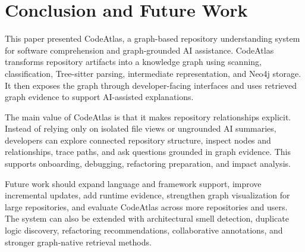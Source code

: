 \documentclass[conference]{IEEEtran}
\begin{document}
\section{Conclusion and Future Work}
This paper presented CodeAtlas, a graph-based repository understanding system for software comprehension and graph-grounded AI assistance. CodeAtlas transforms repository artifacts into a knowledge graph using scanning, classification, Tree-sitter parsing, intermediate representation, and Neo4j storage. It then exposes the graph through developer-facing interfaces and uses retrieved graph evidence to support AI-assisted explanations.

The main value of CodeAtlas is that it makes repository relationships explicit. Instead of relying only on isolated file views or ungrounded AI summaries, developers can explore connected repository structure, inspect nodes and relationships, trace paths, and ask questions grounded in graph evidence. This supports onboarding, debugging, refactoring preparation, and impact analysis.

Future work should expand language and framework support, improve incremental updates, add runtime evidence, strengthen graph visualization for large repositories, and evaluate CodeAtlas across more repositories and users. The system can also be extended with architectural smell detection, duplicate logic discovery, refactoring recommendations, collaborative annotations, and stronger graph-native retrieval methods.
\end{document}
